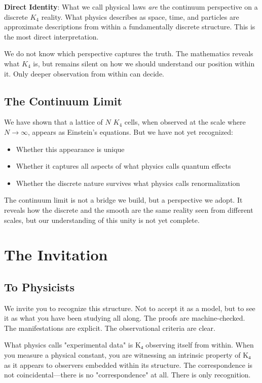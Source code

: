 \documentclass[11pt,a4paper]{book}
\begin{document}
\textbf{Direct Identity}: What we call physical laws \emph{are} the continuum perspective on a discrete $K_4$ reality. What physics describes as space, time, and particles are approximate descriptions from within a fundamentally discrete structure. This is the most direct interpretation.

We do not know which perspective captures the truth. The mathematics reveals what $K_4$ is, but remains silent on how we should understand our position within it. Only deeper observation from within can decide.

\section{The Continuum Limit}

We have shown that a lattice of $N$ $K_4$ cells, when observed at the scale where $N \to \infty$, appears as Einstein's equations. But we have not yet recognized:
\begin{itemize}
\item Whether this appearance is unique
\item Whether it captures all aspects of what physics calls quantum effects
\item Whether the discrete nature survives what physics calls renormalization
\end{itemize}

The continuum limit is not a bridge we build, but a perspective we adopt. It reveals how the discrete and the smooth are the same reality seen from different scales, but our understanding of this unity is not yet complete.

\chapter{The Invitation}

\section{To Physicists}

We invite you to recognize this structure. Not to accept it as a model, but to see it as what you have been studying all along. The proofs are machine-checked. The manifestations are explicit. The observational criteria are clear.

What physics calls "experimental data" is K₄ observing itself from within. When you measure a physical constant, you are witnessing an intrinsic property of K₄ as it appears to observers embedded within its structure. The correspondence is not coincidental—there is no "correspondence" at all. There is only recognition.
\end{document}
